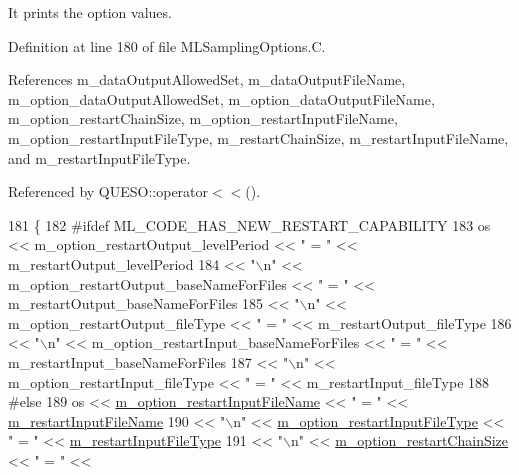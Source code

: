 It prints the option values. 



Definition at line 180 of file M\-L\-Sampling\-Options.\-C.



References m\-\_\-data\-Output\-Allowed\-Set, m\-\_\-data\-Output\-File\-Name, m\-\_\-option\-\_\-data\-Output\-Allowed\-Set, m\-\_\-option\-\_\-data\-Output\-File\-Name, m\-\_\-option\-\_\-restart\-Chain\-Size, m\-\_\-option\-\_\-restart\-Input\-File\-Name, m\-\_\-option\-\_\-restart\-Input\-File\-Type, m\-\_\-restart\-Chain\-Size, m\-\_\-restart\-Input\-File\-Name, and m\-\_\-restart\-Input\-File\-Type.



Referenced by Q\-U\-E\-S\-O\-::operator$<$$<$().


\begin{DoxyCode}
181 \{
182 \textcolor{preprocessor}{#ifdef ML\_CODE\_HAS\_NEW\_RESTART\_CAPABILITY}
183 \textcolor{preprocessor}{}  os <<         m\_option\_restartOutput\_levelPeriod      << \textcolor{stringliteral}{" = "} << m\_restartOutput\_levelPeriod
184      << \textcolor{stringliteral}{"\(\backslash\)n"} << m\_option\_restartOutput\_baseNameForFiles << \textcolor{stringliteral}{" = "} << m\_restartOutput\_baseNameForFiles
185      << \textcolor{stringliteral}{"\(\backslash\)n"} << m\_option\_restartOutput\_fileType         << \textcolor{stringliteral}{" = "} << m\_restartOutput\_fileType
186      << \textcolor{stringliteral}{"\(\backslash\)n"} << m\_option\_restartInput\_baseNameForFiles  << \textcolor{stringliteral}{" = "} << m\_restartInput\_baseNameForFiles
187      << \textcolor{stringliteral}{"\(\backslash\)n"} << m\_option\_restartInput\_fileType          << \textcolor{stringliteral}{" = "} << m\_restartInput\_fileType
188 \textcolor{preprocessor}{#else}
189 \textcolor{preprocessor}{}  os <<         \hyperlink{class_q_u_e_s_o_1_1_m_l_sampling_options_a0fbc7946acb9944500d92503a1a0feaf}{m\_option\_restartInputFileName}           << \textcolor{stringliteral}{" = "} << 
      \hyperlink{class_q_u_e_s_o_1_1_m_l_sampling_options_aff68336a5d6ae4160e541975260450d8}{m\_restartInputFileName}
190      << \textcolor{stringliteral}{"\(\backslash\)n"} << \hyperlink{class_q_u_e_s_o_1_1_m_l_sampling_options_a3fa31b5691319385226e2149b549e269}{m\_option\_restartInputFileType}           << \textcolor{stringliteral}{" = "} << 
      \hyperlink{class_q_u_e_s_o_1_1_m_l_sampling_options_aae8adcb5188369ea144d2144b53cde48}{m\_restartInputFileType}
191      << \textcolor{stringliteral}{"\(\backslash\)n"} << \hyperlink{class_q_u_e_s_o_1_1_m_l_sampling_options_ad37df327253d40983ac3e3ed880069c3}{m\_option\_restartChainSize}               << \textcolor{stringliteral}{" = "} << 

\end{DoxyCode}
